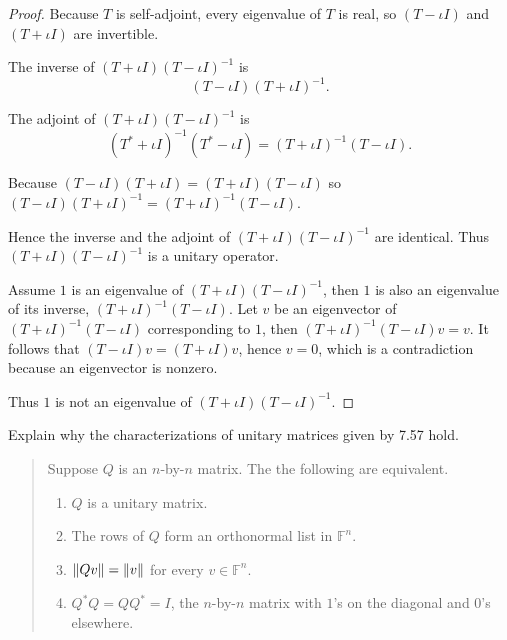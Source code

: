 \begin{proof}
    Because $T$ is self-adjoint, every eigenvalue of $T$ is real, so ${(T - \iota I)}$ and ${(T + \iota I)}$ are invertible.

    The inverse of $(T + \iota I){(T - \iota I)}^{-1}$ is
    \[
        {(T - \iota I)}{(T + \iota I)}^{-1}.
    \]

    The adjoint of $(T + \iota I){(T - \iota I)}^{-1}$ is
    \[
        {(T^{*} + \iota I)}^{-1}(T^{*} - \iota I) = {(T + \iota I)}^{-1}(T - \iota I).
    \]

    Because $(T - \iota I)(T + \iota I) = (T + \iota I)(T - \iota I)$ so ${(T - \iota I)}{(T + \iota I)}^{-1} = {(T + \iota I)}^{-1}(T - \iota I)$.

    Hence the inverse and the adjoint of $(T + \iota I){(T - \iota I)}^{-1}$ are identical. Thus $(T + \iota I){(T - \iota I)}^{-1}$ is a unitary operator.

    \bigskip
    Assume $1$ is an eigenvalue of $(T + \iota I){(T - \iota I)}^{-1}$, then $1$ is also an eigenvalue of its inverse, ${(T + \iota I)}^{-1}(T - \iota I)$. Let $v$ be an eigenvector of ${(T + \iota I)}^{-1}(T - \iota I)$ corresponding to $1$, then ${(T + \iota I)}^{-1}(T - \iota I)v = v$. It follows that $(T - \iota I)v = {(T + \iota I)}v$, hence $v = 0$, which is a contradiction because an eigenvector is nonzero.

    Thus $1$ is not an eigenvalue of $(T + \iota I){(T - \iota I)}^{-1}$.
\end{proof}
\newpage

\begin{exercise}
    Explain why the characterizations of unitary matrices given by 7.57 hold.
\end{exercise}

\begin{quote}
    Suppose $Q$ is an $n$-by-$n$ matrix. The the following are equivalent.
    \begin{enumerate}[label={(\alph*)}]
        \item $Q$ is a unitary matrix.
        \item The rows of $Q$ form an orthonormal list in $\mathbb{F}^{n}$.
        \item $\left\Vert{Qv}\right\Vert = \left\Vert{v}\right\Vert$ for every $v\in\mathbb{F}^{n}$.
        \item $Q^{*}Q = QQ^{*} = I$, the $n$-by-$n$ matrix with $1$'s on the diagonal and $0$'s elsewhere.
    \end{enumerate}
\end{quote}

